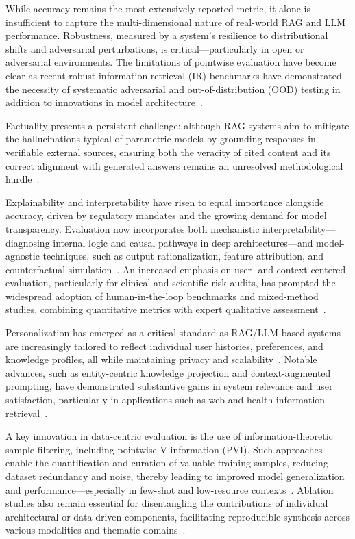 \documentclass[sigconf]{acmart}
\begin{document}
While accuracy remains the most extensively reported metric, it alone is insufficient to capture the multi-dimensional nature of real-world RAG and LLM performance. Robustness, measured by a system’s resilience to distributional shifts and adversarial perturbations, is critical—particularly in open or adversarial environments. The limitations of pointwise evaluation have become clear as recent robust information retrieval (IR) benchmarks have demonstrated the necessity of systematic adversarial and out-of-distribution (OOD) testing in addition to innovations in model architecture~\cite{ref49,ref50,ref54,ref61}. 

Factuality presents a persistent challenge: although RAG systems aim to mitigate the hallucinations typical of parametric models by grounding responses in verifiable external sources, ensuring both the veracity of cited content and its correct alignment with generated answers remains an unresolved methodological hurdle~\cite{ref32,ref33,ref34,ref36,ref37,ref49,ref51,ref52,ref53,ref54,ref55,ref61,ref62,ref63,ref64}. 

Explainability and interpretability have risen to equal importance alongside accuracy, driven by regulatory mandates and the growing demand for model transparency. Evaluation now incorporates both mechanistic interpretability—diagnosing internal logic and causal pathways in deep architectures—and model-agnostic techniques, such as output rationalization, feature attribution, and counterfactual simulation~\cite{ref30,ref32,ref33,ref34,ref36,ref39,ref40,ref41,ref48,ref52,ref53,ref54,ref55,ref63,ref64}. An increased emphasis on user- and context-centered evaluation, particularly for clinical and scientific risk audits, has prompted the widespread adoption of human-in-the-loop benchmarks and mixed-method studies, combining quantitative metrics with expert qualitative assessment~\cite{ref8,ref10,ref22,ref25,ref27,ref29,ref39,ref53,ref54}.

Personalization has emerged as a critical standard as RAG/LLM-based systems are increasingly tailored to reflect individual user histories, preferences, and knowledge profiles, all while maintaining privacy and scalability~\cite{ref38,ref42,ref51,ref52,ref54,ref55,ref61,ref62}. Notable advances, such as entity-centric knowledge projection and context-augmented prompting, have demonstrated substantive gains in system relevance and user satisfaction, particularly in applications such as web and health information retrieval~\cite{ref51,ref55}.

A key innovation in data-centric evaluation is the use of information-theoretic sample filtering, including pointwise V-information (PVI). Such approaches enable the quantification and curation of valuable training samples, reducing dataset redundancy and noise, thereby leading to improved model generalization and performance—especially in few-shot and low-resource contexts~\cite{ref53,ref61,ref62}. Ablation studies also remain essential for disentangling the contributions of individual architectural or data-driven components, facilitating reproducible synthesis across various modalities and thematic domains~\cite{ref32,ref33,ref34,ref36,ref37,ref49,ref51,ref52,ref53,ref54,ref55,ref61,ref62,ref63,ref64}.
\end{document}
